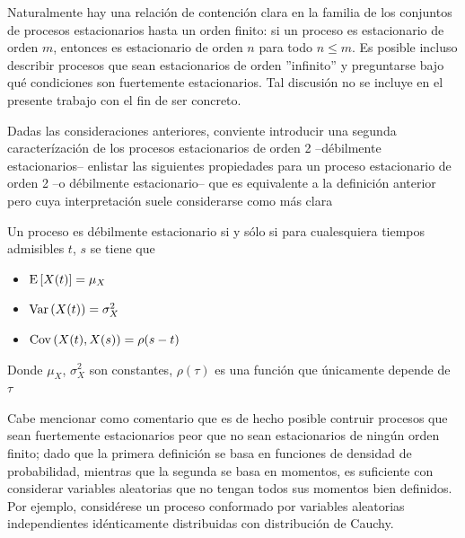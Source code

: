 Naturalmente hay una relaci\'on de contenci\'on clara en
la familia de los conjuntos de procesos estacionarios hasta un orden finito:
si un proceso es estacionario de orden $m$, entonces es estacionario de orden $n$ para todo
$n \leq m$. Es posible incluso describir procesos que sean estacionarios de orden ''infinito''
y preguntarse bajo qu\'e condiciones son fuertemente estacionarios.
Tal discusi\'on no se incluye en el presente trabajo con el fin de ser concreto.


Dadas las consideraciones anteriores, conviente
introducir una segunda caracter\'izaci\'on de los procesos estacionarios de orden 2 --d\'ebilmente 
estacionarios--
 enlistar las siguientes propiedades para un proceso
estacionario de orden 2 --o d\'ebilmente estacionario-- 
que es equivalente
a la definici\'on anterior pero cuya interpretaci\'on suele considerarse como m\'as clara
\begin{thrm}
Un proceso es d\'ebilmente estacionario si y s\'olo si para cualesquiera tiempos admisibles
$t$, $s$ se tiene que
\begin{itemize}
\item $\mathrm{E}\left[ X(t) \right] = \mu_X$
\item $\mathrm{Var}\left( X(t) \right) = \sigma^{2}_X$
\item $\mathrm{Cov}\left( X(t),X(s) \right) = \rho (s-t)$
\end{itemize}
Donde $\mu_X$, $\sigma^{2}_X$ son constantes, $\rho(\tau)$
es una funci\'on que \'unicamente depende de $\tau$
\end{thrm}


Cabe mencionar como comentario que es de hecho posible contruir procesos que sean fuertemente
estacionarios peor que no sean estacionarios de ning\'un orden finito; dado que
la primera definici\'on se basa en funciones de densidad de probabilidad, mientras que la segunda
se basa en momentos, es suficiente con considerar variables aleatorias que no tengan todos
sus momentos bien definidos. Por ejemplo, consid\'erese un proceso conformado por variables
aleatorias independientes id\'enticamente distribuidas con distribuci\'on de Cauchy.

